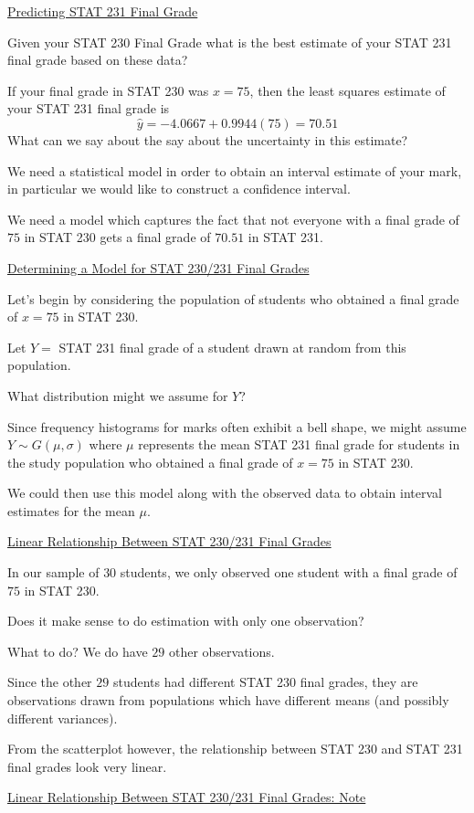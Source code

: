 \documentclass[oneside]{book}
\begin{document}
\underline{Predicting STAT 231 Final Grade}

Given your STAT 230 Final Grade what is the best estimate of your STAT 231 final grade based on
these data?

If your final grade in STAT 230 was $ x=75 $, then the least squares estimate of your STAT 231
final grade is
\[\hat{y}=-4.0667+0.9944(75)=70.51\]
What can we say about the say about the uncertainty in this estimate?

We need a statistical model in order to obtain an interval estimate of your mark,
in particular we would like to construct a confidence interval.

We need a model which captures the fact that not everyone with a final grade of $ 75 $
in STAT 230 gets a final grade of $ 70.51 $ in STAT 231.

\underline{Determining a Model for STAT 230/231 Final Grades}

Let's begin by considering the population of students who obtained a final grade of $ x=75 $
in STAT 230.

Let $ Y = $ STAT 231 final grade of a student drawn at random from this population.

What distribution might we assume for $ Y $?

Since frequency histograms for marks often exhibit a bell shape, we might assume
$ Y\sim G(\mu,\sigma) $ where $ \mu $ represents the mean STAT 231 final grade for students
in the study population who obtained a final grade of $ x=75 $ in STAT 230.

We could then use this model along with the observed data to obtain interval
estimates for the mean $ \mu $.

\underline{Linear Relationship Between STAT 230/231 Final Grades}

In our sample of $ 30 $ students, we only observed one student with a final grade of $ 75 $
in STAT 230.

Does it make sense to do estimation with only one observation?

What to do? We do have $ 29 $ other observations.

Since the other $ 29 $ students had different STAT 230 final grades, they are
observations drawn from populations which have different means (and possibly different variances).

From the scatterplot however, the relationship between STAT 230 and STAT 231
final grades look very linear.


\underline{Linear Relationship Between STAT 230/231 Final Grades: Note}
\end{document}
